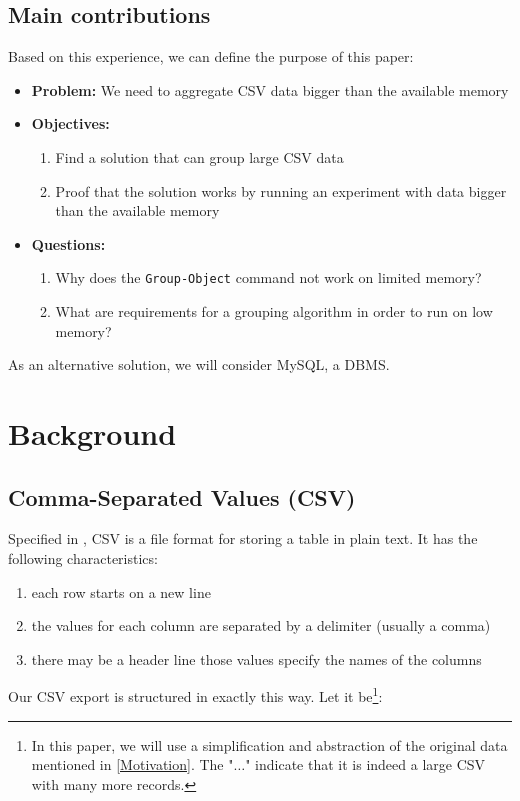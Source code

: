 \subsection{Main contributions}
Based on this experience, we can define the purpose of this paper:
\begin{itemize}
    \item \textbf{Problem:} We need to aggregate CSV data bigger than the available memory
    \item \textbf{Objectives:}
    \begin{enumerate}
        \item Find a solution that can group large CSV data
        \item Proof that the solution works by running an
            experiment with data bigger than the available memory
    \end{enumerate}
    \item \textbf{Questions:}
    \begin{enumerate}
        \item Why does the \verb+Group-Object+ command not work on limited memory?
        \item What are requirements for a grouping algorithm in order to run on low memory?
    \end{enumerate}
\end{itemize}
As an alternative solution, we will consider MySQL, a \gls{DBMS}.

\newpage
\section{Background}

\subsection{Comma-Separated Values (CSV)}

Specified in \cite{rfc4180}, CSV is a file format for storing a table in plain text.
It has the following characteristics:

\begin{enumerate}
    \item each row starts on a new line
    \item the values for each column are separated by a delimiter (usually a comma)
    \item there may be a header line those values specify the names of the columns
\end{enumerate}
Our CSV export is structured in exactly this way. Let it be\footnote{
In this paper, we will use a simplification and abstraction of the original
data mentioned in \ref{Motivation}. The "$\dots$" indicate that
it is indeed a large CSV with many more records.}:

